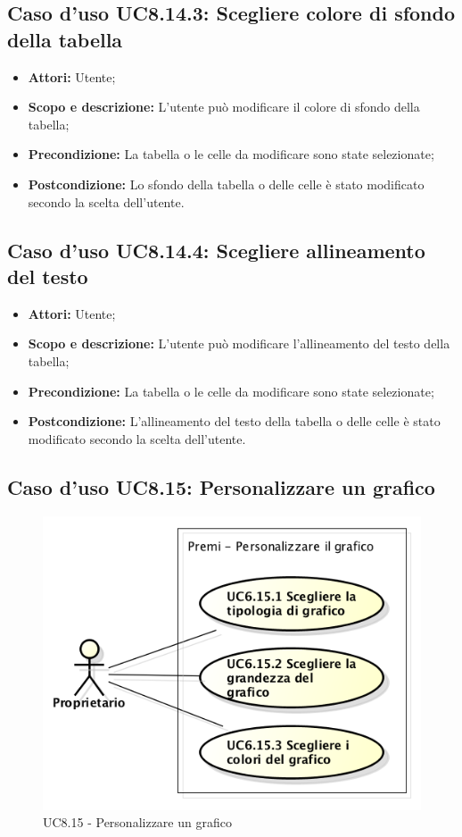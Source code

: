 \subsection{Caso d'uso UC8.14.3: Scegliere colore di sfondo della tabella}
\begin{itemize}
	\item \textbf{Attori:} Utente;
	\item \textbf{Scopo e descrizione:} L'utente può modificare il colore di sfondo della tabella;
	\item \textbf{Precondizione:} La tabella o le celle da modificare sono state selezionate;
	\item \textbf{Postcondizione:} Lo sfondo della tabella o delle celle è stato modificato secondo la scelta dell'utente.
\end{itemize}

\subsection{Caso d'uso UC8.14.4: Scegliere allineamento del testo}
\begin{itemize}
	\item \textbf{Attori:} Utente;
	\item \textbf{Scopo e descrizione:} L'utente può modificare l'allineamento del testo della tabella;
	\item \textbf{Precondizione:} La tabella o le celle da modificare sono state selezionate;
	\item \textbf{Postcondizione:} L'allineamento del testo della tabella o delle celle è stato modificato secondo la scelta dell'utente.
\end{itemize}

\subsection{Caso d'uso UC8.15: Personalizzare un grafico}
\begin{figure}[h] 
	\centering 
	\includegraphics[scale=0.45] {img/UC8.15.png} 
	\caption{UC8.15 - Personalizzare un grafico} 
\end{figure}

